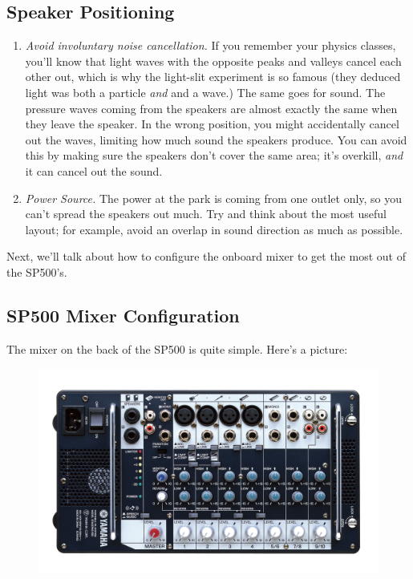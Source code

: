 \documentclass[letterpaper,10pt,oneside,headsepline]{scrreprt}
\begin{document}
\subsection{Speaker Positioning}
\begin{enumerate}
\item \textit{Avoid involuntary noise cancellation.} If you remember your physics classes, you'll know that light waves with the opposite peaks and valleys cancel each other out, which is why the light-slit experiment is so famous (they deduced light was both a particle \textit{and} and a wave.) The same goes for sound. The pressure waves coming from the speakers are almost exactly the same when they leave the speaker. In the wrong position, you might accidentally cancel out the waves, limiting how much sound the speakers produce. You can avoid this by making sure the speakers don't cover the same area; it's overkill, \textit{and} it can cancel out the sound.

\item  \textit{Power Source.} The power at the park is coming from one outlet only, so you can't spread the speakers out much. Try and think about the most useful layout; for example, avoid an overlap in sound direction as much as possible.
\end{enumerate}

Next, we'll talk about how to configure the onboard mixer to get the most out of the SP500's.
\subsection{SP500 Mixer Configuration}
The mixer on the back of the SP500 is quite simple. Here's a picture: 
\begin{figure}[ht]
\centering
\includegraphics[scale=1]{STAGEPAS500_07} 
\end{figure}
\end{document}
